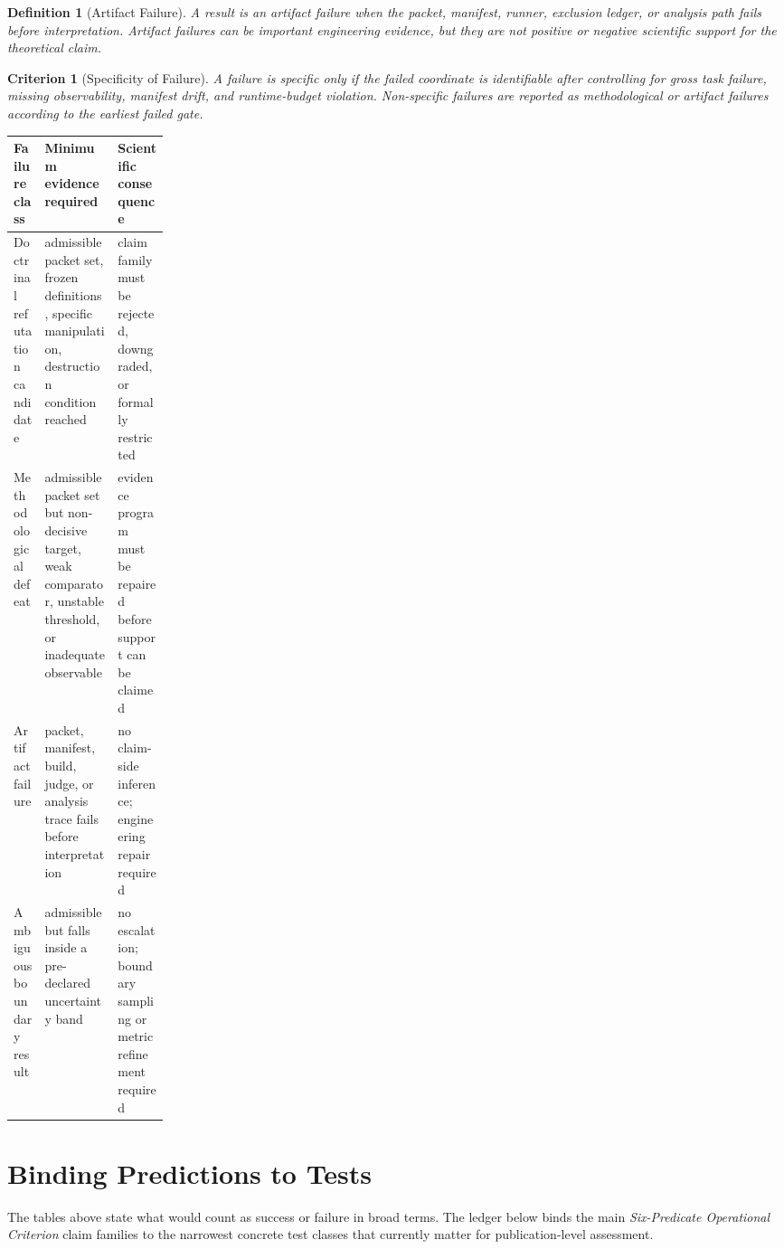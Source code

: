 \documentclass[11pt,a4paper]{article}
\newtheorem{definition}[proposition]{Definition}
\newtheorem{criterion}[proposition]{Criterion}
\begin{document}
\begin{definition}[Artifact Failure]
A result is an artifact failure when the packet, manifest, runner, exclusion
ledger, or analysis path fails before interpretation. Artifact failures can be
important engineering evidence, but they are not positive or negative scientific
support for the theoretical claim.
\end{definition}

\begin{criterion}[Specificity of Failure]
A failure is specific only if the failed coordinate is identifiable after
controlling for gross task failure, missing observability, manifest drift, and
runtime-budget violation. Non-specific failures are reported as methodological or
artifact failures according to the earliest failed gate.
\end{criterion}

\begin{center}
\small
\renewcommand{\arraystretch}{1.16}
\setlength{\tabcolsep}{4pt}
\begin{tabularx}{\linewidth}{@{}P{0.20\linewidth}Y Y@{}}
\toprule
Failure class & Minimum evidence required & Scientific consequence \\
\midrule
Doctrinal refutation candidate & admissible packet set, frozen definitions, specific manipulation, destruction condition reached & claim family must be rejected, downgraded, or formally restricted \\
Methodological defeat & admissible packet set but non-decisive target, weak comparator, unstable threshold, or inadequate observable & evidence program must be repaired before support can be claimed \\
Artifact failure & packet, manifest, build, judge, or analysis trace fails before interpretation & no claim-side inference; engineering repair required \\
Ambiguous boundary result & admissible but falls inside a pre-declared uncertainty band & no escalation; boundary sampling or metric refinement required \\
\bottomrule
\end{tabularx}
\end{center}

\section{Binding Predictions to Tests}
The tables above state what would count as success or failure in broad terms. The ledger below binds the main \textit{Six-Predicate Operational Criterion} claim families to the narrowest concrete test classes that currently matter for publication-level assessment.
\end{document}

